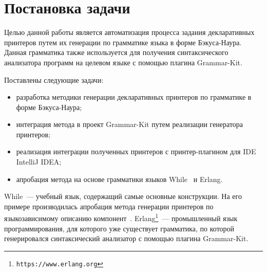\section{Постановка задачи}

Целью данной работы является автоматизация процесса задания декларативных принтеров путем их генерации по грамматике языка в форме Бэкуса-Наура.
Данная грамматика также используется для получения синтаксического анализатора программ на целевом языке с помощью плагина Grammar-Kit. 

Поставлены следующие задачи:
\begin{itemize}
    \item разработка методики генерации декларативных принтеров по грамматике в форме Бэкуса-Наура;
    \item интеграция метода в проект Grammar-Kit путем реализации генератора принтеров;
    \item реализация интеграции полученных принтеров с принтер-плагином для IDE IntelliJ IDEA;
    \item апробация метода на основе грамматики языков While~\cite{paper:nielson} и Erlang.
\end{itemize}
While~--- учебный язык, содержащий самые основные конструкции.
На его примере производилась апробация метода генерации принтеров по языкозависимому описанию компонент~\cite{paper:while}. 
Erlang\footnote{\texttt{https://www.erlang.org}}~--- промышленный язык программирования, для которого уже существует грамматика, по которой генерировался синтаксический анализатор с помощью плагина Grammar-Kit.

